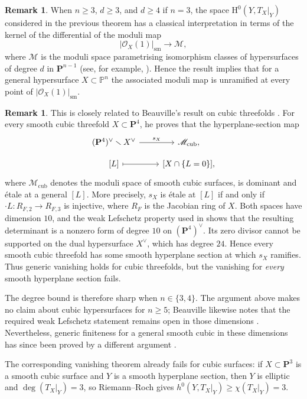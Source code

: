 \documentclass[a4paper,12pt,twoside,reqno]{amsart}
\numberwithin{equation}{section}
\theoremstyle{plain}
\theoremstyle{definition}
\newtheorem{remark}[theorem]{Remark}
\newcommand{\PP}{\mathbf{P}}
\newcommand{\sm}{\mathrm{sm}}
\newcommand{\Mmod}{\mathscr{M}}
\newcommand{\HH}{\mathrm{H}}
\theoremstyle{plain}
\theoremstyle{definition}
\begin{document}
\begin{remark}
\label{remarkunramifiedness}
When $n \geq 3$, $d \geq 3$, and $d \geq 4$ if $n=3$, the space $\HH^0(Y,T_X|_Y)$ considered in the previous theorem has a classical interpretation in terms of the kernel of the differential of the moduli map
\[
|\mathcal{O}_X(1)|_{\sm} \rightarrow \mathcal{M},
\]
where $\mathcal{M}$ is the moduli space parametrising isomorphism classes of hypersurfaces of degree $d$ in $\PP^{n-1}$ (see, for example, \cite[Section~1]{BE}). Hence the result implies that for a general hypersurface $X \subset \mathbb{P}^n$ the associated moduli map is unramified at every point of $|\mathcal{O}_X(1)|_{\sm}$.
\end{remark}

\begin{remark}
This is closely related to Beauville's result on cubic threefolds \cite{BeauvilleCubic}. For every smooth cubic threefold $X\subset\PP^4$, he proves that the hyperplane-section map
\[
\begin{tikzcd}[row sep=small]
(\PP^4)^\vee\smallsetminus X^\vee \arrow[r, "s_X"]
& \Mmod_{\mathrm{cub}},\\
{[L]} \arrow[r, mapsto] & {[X\cap\{L=0\}]},
\end{tikzcd}
\]
where $\Mmod_{\mathrm{cub}}$ denotes the moduli space of smooth cubic surfaces, is dominant and \'etale at a general $[L]$. More precisely, $s_X$ is \'etale at $[L]$ if and only if $\cdot L\colon R_{F,2}\to R_{F,3}$ is injective, where $R_F$ is the Jacobian ring of $X$. Both spaces have dimension $10$, and the weak Lefschetz property used in \cite{BeauvilleCubic} shows that the resulting determinant is a nonzero form of degree $10$ on $(\PP^4)^\vee$. Its zero divisor cannot be supported on the dual hypersurface $X^\vee$, which has degree $24$. Hence every smooth cubic threefold has some smooth hyperplane section at which $s_X$ ramifies. Thus generic vanishing holds for cubic threefolds, but the vanishing for \emph{every} smooth hyperplane section fails.

The degree bound is therefore sharp when $n\in\{3,4\}$. The argument above makes no claim about cubic hypersurfaces for $n\ge5$; Beauville likewise notes that the required weak Lefschetz statement remains open in those dimensions \cite[Remark~1]{BeauvilleCubic}. Nevertheless, generic finiteness for a general smooth cubic in these dimensions has since been proved by a different argument \cite[Corollary~6.6]{IlardiNasrollahTafazolian}.

The corresponding vanishing theorem already fails for cubic surfaces: if $X\subset\PP^3$ is a smooth cubic surface and $Y$ is a smooth hyperplane section, then $Y$ is elliptic and $\deg(T_X|_Y)=3$, so Riemann--Roch gives $h^0(Y,T_X|_Y)\ge\chi(T_X|_Y)=3$.
\end{remark}
\end{document}
